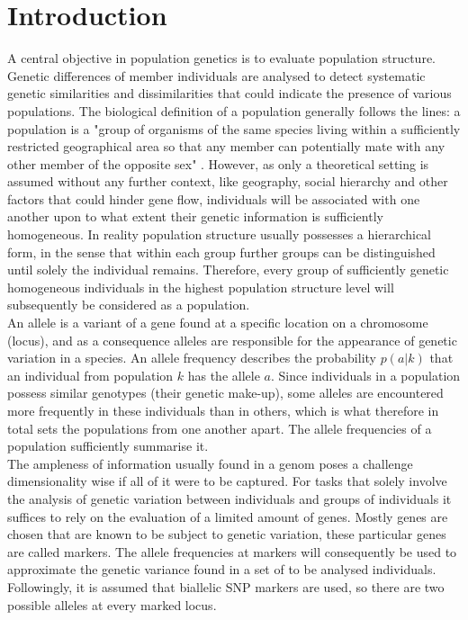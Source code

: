 \documentclass[a4paper, 11pt]{article}
\begin{document}
\newpage

	

\tableofcontents

\newpage

\section{Introduction}
A central objective in population genetics is to evaluate population structure. Genetic differences of member individuals are analysed  to detect systematic genetic similarities and dissimilarities that could indicate the presence of various populations. The biological definition of a population generally follows the lines: a population is a "group of organisms of the same species living within a sufficiently restricted geographical area so that any member can potentially mate with any other member of the opposite sex" \parencite{hartl1997principles}. However, as only a theoretical setting is assumed without any further context, like geography, social hierarchy and other factors that could hinder gene flow, individuals will be associated with one another upon to what extent their genetic information is sufficiently homogeneous. In reality population structure usually possesses a hierarchical form, in the sense that within each group further groups can be distinguished until solely the individual remains. Therefore, every group of sufficiently genetic homogeneous individuals in the highest population structure level will subsequently be considered as a population.\\
An allele is a variant of a gene found at a specific location on a chromosome (locus), and as a consequence alleles are responsible for the appearance of genetic variation in a species. An allele frequency describes the probability $p(a | k)$ that an individual from population $k$ has the allele $a$. Since individuals in a population possess similar genotypes (their genetic make-up), some alleles are encountered more frequently in these individuals than in others, which is what therefore in total sets the populations from one another apart. The allele frequencies of a population sufficiently summarise it.\\
The ampleness of information usually found in a genom poses a challenge dimensionality wise if all of it were to be captured. For tasks that solely involve the analysis of genetic variation between individuals and groups of individuals it suffices to rely on the evaluation of a limited amount of genes. Mostly genes are chosen that are known to be subject to genetic variation, these particular genes are called markers. The allele frequencies at markers will consequently be used to approximate the genetic variance found in a set of to be analysed individuals. Followingly, it is assumed that biallelic SNP markers are used, so there are two possible alleles at every marked locus.\\
\end{document}
